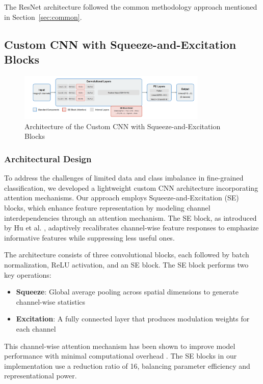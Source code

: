 \documentclass[a4paper,12pt]{report}
\begin{document}
The ResNet architecture followed the common methodology approach mentioned in Section~\ref{sec:common}.

\subsection{Custom CNN with Squeeze-and-Excitation Blocks}

\begin{figure}[H]
    \centering
    \includegraphics[width=0.8\textwidth]{images/architecture/improvedcnn.png}
    \caption{Architecture of the Custom CNN with Squeeze-and-Excitation Blocks}
    \label{fig:improvedcnn_architecture}
\end{figure}

\subsubsection{Architectural Design}

To address the challenges of limited data and class imbalance in fine-grained classification, we developed a lightweight custom CNN architecture incorporating attention mechanisms. Our approach employs Squeeze-and-Excitation (SE) blocks, which enhance feature representation by modeling channel interdependencies through an attention mechanism. The SE block, as introduced by Hu et al. \citep{Hu_2018_CVPR}, adaptively recalibrates channel-wise feature responses to emphasize informative features while suppressing less useful ones.

The architecture consists of three convolutional blocks, each followed by batch normalization, ReLU activation, and an SE block. The SE block performs two key operations:
\begin{itemize}
    \item \textbf{Squeeze}: Global average pooling across spatial dimensions to generate channel-wise statistics
    \item \textbf{Excitation}: A fully connected layer that produces modulation weights for each channel
\end{itemize}

This channel-wise attention mechanism has been shown to improve model performance with minimal computational overhead \citep{Hu_2018_CVPR}. The SE blocks in our implementation use a reduction ratio of 16, balancing parameter efficiency and representational power.
\end{document}
